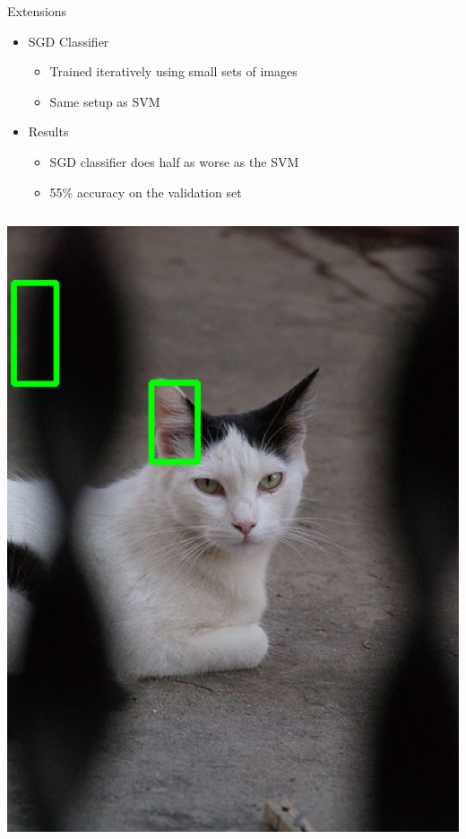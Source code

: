 \documentclass[compress,aspectratio=43]{beamer}
\begin{document}
\begin{frame}{Extensions}
 {
    \begin{itemize}
    \item SGD Classifier
        \begin{itemize}
            \item Trained iteratively using small sets of images
            \item Same setup as SVM
        \end{itemize}
    \item Results
        \begin{itemize}
        \item SGD classifier does half as worse as the SVM
        \item 55\% accuracy on the validation set
        \end{itemize}
    \end{itemize}
}
 {
    \begin{columns}
        \begin{column}{0.3\textwidth}
    		\centering
    		\includegraphics[width=1\linewidth]{figures/sgd/car.png} \\

\end{column}
\end{columns}}
\end{frame}
\end{document}
